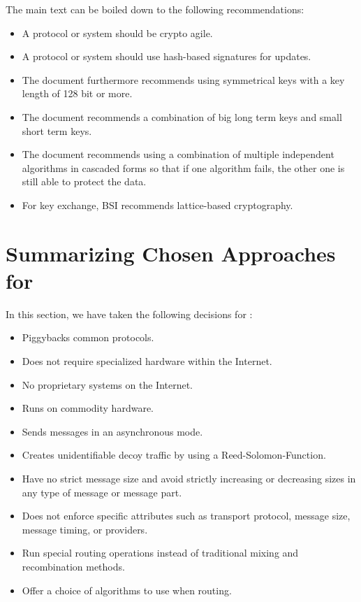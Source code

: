\begin{itemize}
	The main text can be boiled down to the following recommendations:
	\begin{itemize}
		\item A protocol or system should be crypto agile.
		\item A protocol or system should use hash-based signatures for updates.
		\item The document furthermore recommends using symmetrical keys with a key length of 128 bit or more.
		\item The document recommends a combination of big long term keys and small short term keys.
		\item The document recommends using a combination of multiple independent algorithms in cascaded forms so that if one algorithm fails, the other one is still able to protect the data.
		\item For key exchange, BSI recommends lattice-based cryptography.
	\end{itemize} 
\end{itemize}

\section{Summarizing Chosen Approaches for \MessageVortex\label{sec:reqSummary}}
In this section, we have taken the following decisions for \MessageVortex:
\begin{itemize}
	\item Piggybacks common protocols.
	\item Does not require specialized hardware within the Internet.
	\item No proprietary systems on the Internet.
	\item Runs on commodity hardware.
	\item Sends messages in an asynchronous mode.
	\item Creates unidentifiable decoy traffic by using a Reed-Solomon-Function.
	\item Have no strict message size and avoid strictly increasing or decreasing sizes in any type of message or message part.
	\item Does not enforce specific attributes such as transport protocol, message size, message timing, or providers.
	\item Run special routing operations instead of traditional mixing and recombination methods.
	\item Offer a choice of algorithms to use when routing.
\end{itemize}

